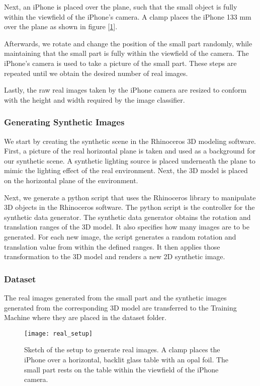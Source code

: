 Next, an iPhone is placed over the plane, such that the small object is fully within the viewfield of the iPhone's camera. A clamp places the iPhone 133 mm over the plane as shown in figure [\ref{fig:RealSetup}].

Afterwards, we rotate and change the position of the small part randomly, while maintaining that the small part is fully within the viewfield of the camera. The iPhone's camera is used to take a picture of the small part. These steps are repeated until we obtain the desired number of real images.

Lastly, the raw real images taken by the iPhone camera are resized to conform with the height and width required by the image classifier.

\subsubsection{Generating Synthetic Images}
We start by creating the synthetic scene in the Rhinoceros 3D modeling software. First, a picture of the real horizontal plane is taken and used as a background for our synthetic scene. A synthetic lighting source is placed underneath the plane to mimic the lighting effect of the real environment. Next, the 3D model is placed on the horizontal plane of the environment.

Next, we generate a python script that uses the Rhinoceros library to manipulate 3D objects in the Rhinoceros software. The python script is the controller for the synthetic data generator. The synthetic data generator obtains the rotation and translation ranges of the 3D model. It also specifies how many images are to be generated. For each new image, the script generates a random rotation and translation value from within the defined ranges. It then applies those transformation to the 3D model and renders a new 2D synthetic image.

\subsubsection{Dataset}
The real images generated from the small part and the synthetic images generated from the corresponding 3D model are transferred to the Training Machine where they are placed in the dataset folder.

\begin{figure}[H]
\centering
  \texttt{[image: real\_setup]}
\caption{Sketch of the setup to generate real images. A clamp places the iPhone over a horizontal, backlit glass table with an opal foil. The small part rests on the table within the viewfield of the iPhone camera.}
\label{fig:RealSetup}
\end{figure}

